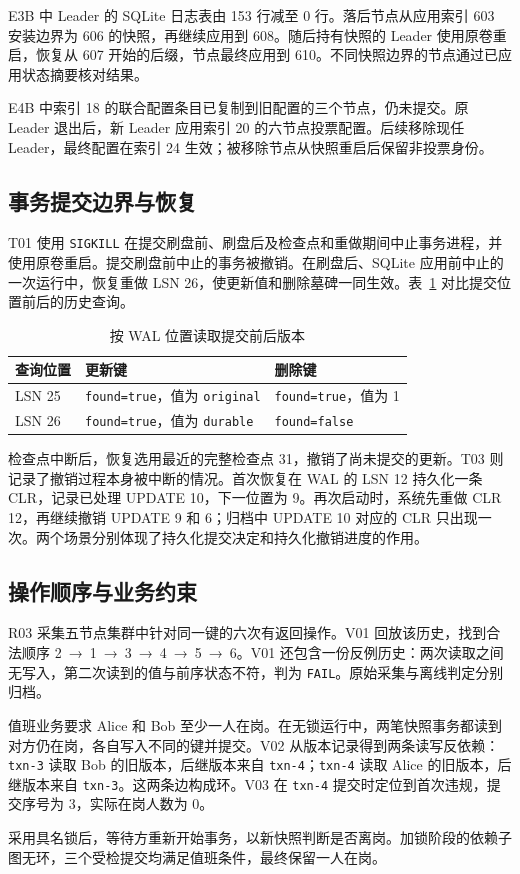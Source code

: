 E3B 中 Leader 的 SQLite 日志表由 153 行减至 0 行。落后节点从应用索引 603 安装边界为 606 的快照，再继续应用到 608。随后持有快照的 Leader 使用原卷重启，恢复从 607 开始的后缀，节点最终应用到 610。不同快照边界的节点通过已应用状态摘要核对结果。

E4B 中索引 18 的联合配置条目已复制到旧配置的三个节点，仍未提交。原 Leader 退出后，新 Leader 应用索引 20 的六节点投票配置。后续移除现任 Leader，最终配置在索引 24 生效；被移除节点从快照重启后保留非投票身份。

\subsection{事务提交边界与恢复}
T01 使用 \texttt{SIGKILL} 在提交刷盘前、刷盘后及检查点和重做期间中止事务进程，并使用原卷重启。提交刷盘前中止的事务被撤销。在刷盘后、SQLite 应用前中止的一次运行中，恢复重做 LSN 26，使更新值和删除墓碑一同生效。表~\ref{tab:as-of} 对比提交位置前后的历史查询。

\begin{table}[htbp]
\centering
\caption{按 WAL 位置读取提交前后版本}
\label{tab:as-of}
\begin{tabularx}{\linewidth}{@{}l X X@{}}
\toprule
查询位置 & 更新键 & 删除键 \\
\midrule
LSN 25 & \texttt{found=true}，值为 \texttt{original} & \texttt{found=true}，值为 1 \\
LSN 26 & \texttt{found=true}，值为 \texttt{durable} & \texttt{found=false} \\
\bottomrule
\end{tabularx}
\end{table}

检查点中断后，恢复选用最近的完整检查点 31，撤销了尚未提交的更新。T03 则记录了撤销过程本身被中断的情况。首次恢复在 WAL 的 LSN 12 持久化一条 CLR，记录已处理 UPDATE 10，下一位置为 9。再次启动时，系统先重做 CLR 12，再继续撤销 UPDATE 9 和 6；归档中 UPDATE 10 对应的 CLR 只出现一次。两个场景分别体现了持久化提交决定和持久化撤销进度的作用。

\subsection{操作顺序与业务约束}
R03 采集五节点集群中针对同一键的六次有返回操作。V01 回放该历史，找到合法顺序 \mbox{2 → 1 → 3 → 4 → 5 → 6}。V01 还包含一份反例历史：两次读取之间无写入，第二次读到的值与前序状态不符，判为 \texttt{FAIL}。原始采集与离线判定分别归档。

值班业务要求 Alice 和 Bob 至少一人在岗。在无锁运行中，两笔快照事务都读到对方仍在岗，各自写入不同的键并提交。V02 从版本记录得到两条读写反依赖：\texttt{txn-3} 读取 Bob 的旧版本，后继版本来自 \texttt{txn-4}；\texttt{txn-4} 读取 Alice 的旧版本，后继版本来自 \texttt{txn-3}。这两条边构成环。V03 在 \texttt{txn-4} 提交时定位到首次违规，提交序号为 3，实际在岗人数为 0。

采用具名锁后，等待方重新开始事务，以新快照判断是否离岗。加锁阶段的依赖子图无环，三个受检提交均满足值班条件，最终保留一人在岗。

